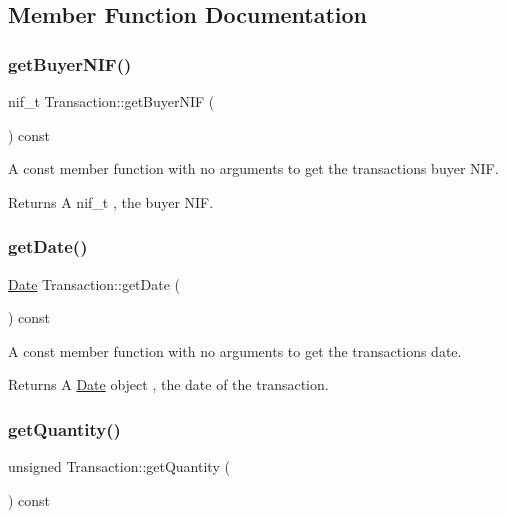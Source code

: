\subsection{Member Function Documentation}
\mbox{\label{class_transaction_afa91c88bb936d8bd8480ac36b599649b}} 
\subsubsection{\texorpdfstring{get\+Buyer\+N\+I\+F()}{getBuyerNIF()}}
{\footnotesize\ttfamily nif\+\_\+t Transaction\+::get\+Buyer\+N\+IF (\begin{DoxyParamCaption}{ }\end{DoxyParamCaption}) const}

A const member function with no arguments to get the transaction\textquotesingle{}s buyer N\+IF. \begin{DoxyReturn}{Returns}
A nif\+\_\+t , the buyer N\+IF. 
\end{DoxyReturn}
\mbox{\label{class_transaction_af2ef4a1ef82f9ff5d34dae7234211589}} 
\subsubsection{\texorpdfstring{get\+Date()}{getDate()}}
{\footnotesize\ttfamily \hyperlink{class_date}{Date} Transaction\+::get\+Date (\begin{DoxyParamCaption}{ }\end{DoxyParamCaption}) const}

A const member function with no arguments to get the transaction\textquotesingle{}s date. \begin{DoxyReturn}{Returns}
A \hyperlink{class_date}{Date} object , the date of the transaction. 
\end{DoxyReturn}
\mbox{\label{class_transaction_ab3bfaa0469e1f45c5bd5dc164ac3c850}} 
\subsubsection{\texorpdfstring{get\+Quantity()}{getQuantity()}}
{\footnotesize\ttfamily unsigned Transaction\+::get\+Quantity (\begin{DoxyParamCaption}{ }\end{DoxyParamCaption}) const}

